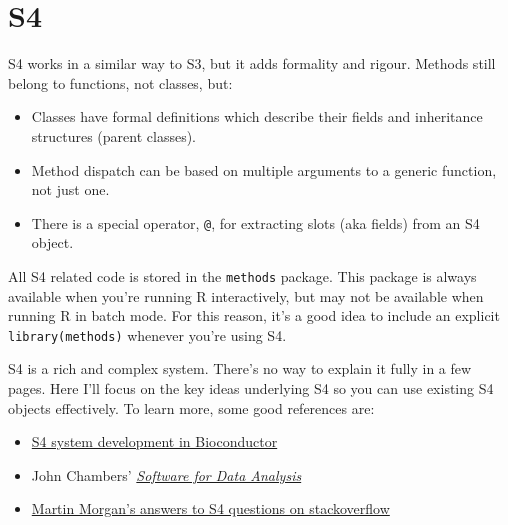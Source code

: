 \begin{enumerate}
\begin{Shaded}
\begin{Highlighting}[]
\StringTok{ }\NormalTok{() }
\StringTok{ }\NormalTok{() }


\StringTok{ }
\end{Highlighting}
\end{Shaded}
\end{enumerate}

\hypertarget{s4}{%
\section{S4}\label{s4}}

S4 works in a similar way to S3, but it adds formality and rigour.
Methods still belong to functions, not classes, but:
 

\begin{itemize}
\item
  Classes have formal definitions which describe their fields and
  inheritance structures (parent classes).
\item
  Method dispatch can be based on multiple arguments to a generic
  function, not just one.
\item
  There is a special operator, \texttt{@}, for extracting slots (aka
  fields) from an S4 object.
\end{itemize}

All S4 related code is stored in the \texttt{methods} package. This
package is always available when you're running R interactively, but may
not be available when running R in batch mode. For this reason, it's a
good idea to include an explicit \texttt{library(methods)} whenever
you're using S4.

S4 is a rich and complex system. There's no way to explain it fully in a
few pages. Here I'll focus on the key ideas underlying S4 so you can use
existing S4 objects effectively. To learn more, some good references
are:

\begin{itemize}
\item
  \href{http://www.bioconductor.org/help/course-materials/2010/AdvancedR/S4InBioconductor.pdf}{S4
  system development in Bioconductor}
\item
  John Chambers'
  \href{http://amzn.com/0387759352?tag=devtools-20}{\emph{Software for
  Data Analysis}}
\item
  \href{http://stackoverflow.com/search?tab=votes\&q=user\%3a547331\%20\%5bs4\%5d\%20is\%3aanswe}{Martin
  Morgan's answers to S4 questions on stackoverflow}
\end{itemize}

